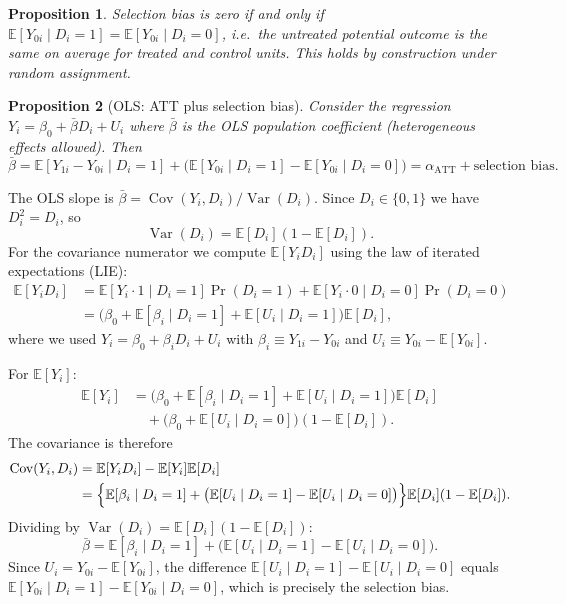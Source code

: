 \documentclass[12pt,a4paper]{article}
\theoremstyle{plain}
\newtheorem{propositio}{Proposition}[section]
\theoremstyle{definition}
\renewenvironment{proof}{\pushQED{\qed}\normalfont}{\popQED\par\nobreak}
\newcommand{\E}{\mathbb{E}}
\newcommand{\Cov}{\operatorname{Cov}}
\newcommand{\Var}{\operatorname{Var}}
\newcommand{\ATT}{\alpha_{\mathrm{ATT}}}
\begin{document}
\begin{propositio}
  Selection bias is zero if and only if $\E[Y_{0i}\mid D_i=1]=\E[Y_{0i}\mid D_i=0]$, i.e.\ the untreated potential outcome is the same on average for treated and control units.
  This holds by construction under random assignment.
\end{propositio}

\begin{propositio}[OLS: ATT plus selection bias\label{prop:ols_att}]
Consider the regression $Y_i = \beta_0 + \bar\beta D_i + U_i$ where $\bar\beta$ is the OLS population coefficient (heterogeneous effects allowed).
Then
\[
  \bar\beta = \E[Y_{1i}-Y_{0i}\mid D_i=1]
              + \bigl(\E[Y_{0i}\mid D_i=1]-\E[Y_{0i}\mid D_i=0]\bigr)
            = \ATT + \text{selection bias}.
\]
\end{propositio}

\begin{proof}
The OLS slope is $\bar\beta = \Cov(Y_i,D_i)/\Var(D_i)$.  Since $D_i\in\{0,1\}$ we have $D_i^2=D_i$, so
\[
  \Var(D_i) = \E[D_i](1-\E[D_i]).
\]
For the covariance numerator we compute $\E[Y_i D_i]$ using the law of iterated expectations (LIE):
\begin{align*}
  \E[Y_i D_i]
  &= \E[Y_i\cdot 1\mid D_i=1]\Pr(D_i=1) + \E[Y_i\cdot 0\mid D_i=0]\Pr(D_i=0)\\
  &= \bigl(\beta_0 + \E[\beta_i\mid D_i=1] + \E[U_i\mid D_i=1]\bigr)\E[D_i],
\end{align*}
where we used $Y_i = \beta_0 + \beta_i D_i + U_i$ with $\beta_i\equiv Y_{1i}-Y_{0i}$ and $U_i\equiv Y_{0i}-\E[Y_{0i}]$.

For $\E[Y_i]$:
\begin{align*}
  \E[Y_i]
  &= \bigl(\beta_0+\E[\beta_i\mid D_i=1]+\E[U_i\mid D_i=1]\bigr)\E[D_i]\\
  &\quad + \bigl(\beta_0+\E[U_i\mid D_i=0]\bigr)(1-\E[D_i]).
\end{align*}
The covariance is therefore
\begin{align*}
  \Cov(Y_i,D_i)
  &= \E[Y_iD_i] - \E[Y_i]\E[D_i]\\
  &= \Bigl\{\E[\beta_i\mid D_i=1]
     + \bigl(\E[U_i\mid D_i=1]-\E[U_i\mid D_i=0]\bigr)\Bigr\}\E[D_i](1-\E[D_i]).
\end{align*}
Dividing by $\Var(D_i)=\E[D_i](1-\E[D_i])$:
\[
  \bar\beta
  = \E[\beta_i\mid D_i=1]
    + \bigl(\E[U_i\mid D_i=1]-\E[U_i\mid D_i=0]\bigr).
\]
Since $U_i = Y_{0i}-\E[Y_{0i}]$, the difference $\E[U_i\mid D_i=1]-\E[U_i\mid D_i=0]$ equals $\E[Y_{0i}\mid D_i=1]-\E[Y_{0i}\mid D_i=0]$, which is precisely the selection bias.
\end{proof}
\end{document}
